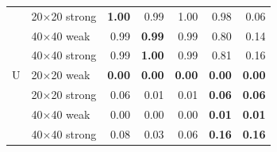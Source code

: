 {\begin{tabular}{llrrrrr}
 & 20$\times$20 strong & \textbf{1.00} & 0.99 & 1.00 & 0.98 & 0.06 \\
 & 40$\times$40 weak & 0.99 & \textbf{0.99} & 0.99 & 0.80 & 0.14 \\
 & 40$\times$40 strong & 0.99 & \textbf{1.00} & 0.99 & 0.81 & 0.16 \\
\addlinespace
U & 20$\times$20 weak & \textbf{0.00} & \textbf{0.00} & \textbf{0.00} & \textbf{0.00} & \textbf{0.00} \\
 & 20$\times$20 strong & 0.06 & 0.01 & 0.01 & \textbf{0.06} & \textbf{0.06} \\
 & 40$\times$40 weak & 0.00 & 0.00 & 0.00 & \textbf{0.01} & \textbf{0.01} \\
 & 40$\times$40 strong & 0.08 & 0.03 & 0.06 & \textbf{0.16} & \textbf{0.16} \\
\bottomrule
\end{tabular}
}
